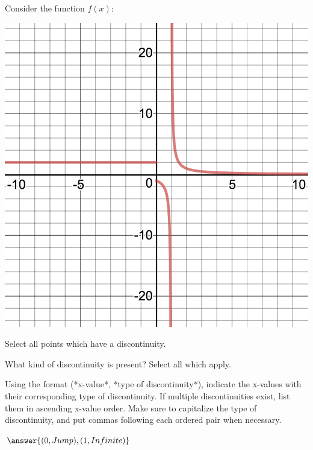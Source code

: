 \documentclass{ximera}
\begin{document}
\begin{question}
Consider the function $f(x)$:
\begin{image}
\includegraphics{continuity4}
\end{image}
Select all points which have a discontinuity.

\begin{selectAll}
\end{selectAll}

What kind of discontinuity is present? Select all which apply.

\begin{selectAll}
\end{selectAll}

Using the format (*x-value*, *type of discontinuity*), indicate the x-values with their corresponding type of discontinuity. If multiple discontinuities exist, list them in ascending x-value order. Make sure to capitalize the type of discontinuity, and put commas following each ordered pair when necessary.

$\answer{(0, Jump), (1, Infinite)}$
\end{question}
\end{document}

